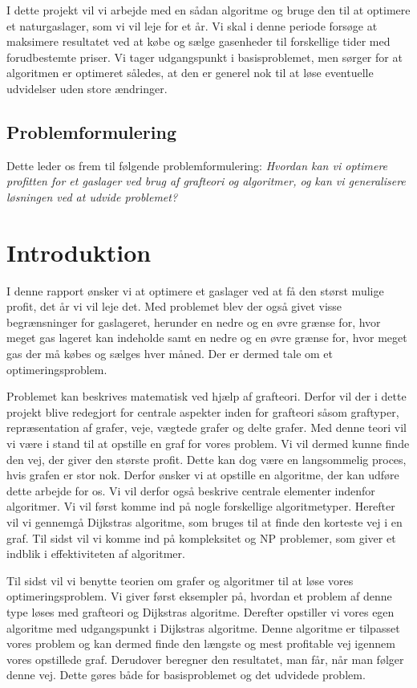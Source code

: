 I dette projekt vil vi arbejde med en sådan algoritme og bruge den til at optimere et naturgaslager, som vi vil leje for et år. Vi skal i denne periode forsøge at maksimere resultatet ved at købe og sælge gasenheder til forskellige tider med forudbestemte priser. Vi tager udgangspunkt i basisproblemet, men sørger for at algoritmen er optimeret således, at den er generel nok til at løse eventuelle udvidelser uden store ændringer.

\subsection{Problemformulering}
Dette leder os frem til følgende problemformulering:
\textit{Hvordan kan vi optimere profitten for et gaslager ved brug af grafteori og algoritmer, og kan vi generalisere løsningen ved at udvide problemet?}

\section{Introduktion}
I denne rapport ønsker vi at optimere et gaslager ved at få den størst mulige profit, det år vi vil leje det. Med problemet blev der også givet visse begrænsninger for gaslageret, herunder en nedre og en øvre grænse for, hvor meget gas lageret kan indeholde samt en nedre og en øvre grænse for, hvor meget gas der må købes og sælges hver måned. Der er dermed tale om et optimeringsproblem. 

Problemet kan beskrives matematisk ved hjælp af grafteori. Derfor vil der i dette projekt blive redegjort for centrale aspekter inden for grafteori såsom graftyper, repræsentation af grafer, veje, vægtede grafer og delte grafer. Med denne teori vil vi være i stand til at opstille en graf for vores problem. Vi vil dermed kunne finde den vej, der giver den største profit. 
Dette kan dog være en langsommelig proces, hvis grafen er stor nok. Derfor ønsker vi at opstille en algoritme, der kan udføre dette arbejde for os. Vi vil derfor også beskrive centrale elementer indenfor algoritmer. Vi vil først komme ind på nogle forskellige algoritmetyper. Herefter vil vi gennemgå Dijkstras algoritme, som bruges til at finde den korteste vej i en graf. Til sidst vil vi komme ind på kompleksitet og NP problemer, som giver et indblik i effektiviteten af algoritmer.

Til sidst vil vi benytte teorien om grafer og algoritmer til at løse vores optimeringsproblem. Vi giver først eksempler på, hvordan et problem af denne type løses med grafteori og Dijkstras algoritme. Derefter opstiller vi vores egen algoritme med udgangspunkt i Dijkstras algoritme. Denne algoritme er tilpasset vores problem og kan dermed finde den længste og mest profitable vej igennem vores opstillede graf. Derudover beregner den resultatet, man får, når man følger denne vej. Dette gøres både for basisproblemet og det udvidede problem.




